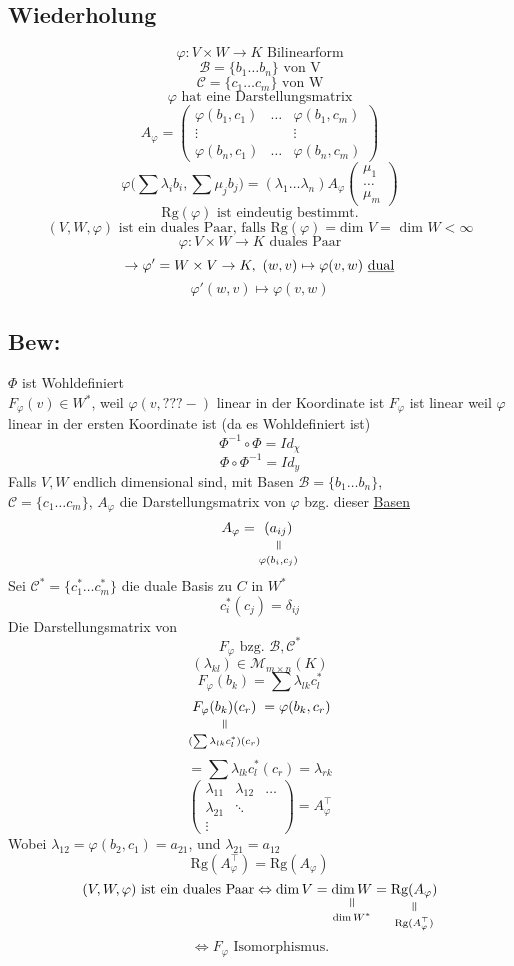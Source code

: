 \documentclass[titlepage,12pt,a4paper,ngerman]{report}
\newcommand{\verteq}{\rotatebox{90}{$\,=$}}
\newcommand{\equalto}[2]{\underset{\scriptstyle\overset{\mkern4mu\verteq}{#2}}{#1}}
\newcommand{\tx}[1]{\textrm{#1}}
\begin{document}
\subsection{Wiederholung}
$$\varphi: V \times W \to K \tx{ Bilinearform}$$
$$\mathcal B = \{b_1 \dots b_n\} \tx{ von V}$$
$$\mathcal C = \{c_1 \dots c_m\} \tx{ von W}$$
$$\varphi \tx{ hat eine Darstellungsmatrix}$$
$$A_\varphi = 
\begin{pmatrix}
\varphi(b_1, c_1) & \dots & \varphi(b_1, c_m) \\
\vdots & & \vdots \\
\varphi(b_n, c_1) & \dots & \varphi(b_n, c_m)	
\end{pmatrix}$$
$$\varphi \bigg( \sum \lambda_i b_i, \sum \mu_j b_j \bigg) = (\lambda_1 \dots \lambda_n) A_\varphi \begin{pmatrix} \mu_1 \\ \dots \\ \mu_m \end{pmatrix}$$
$$\tx{Rg}(\varphi) \tx{ ist eindeutig bestimmt.}$$
$$(V, W, \varphi) \tx{ ist ein duales Paar, falls } \tx{Rg}(\varphi) = \tx{dim } V = \tx{ dim } W < \infty$$
$$ \varphi: V \times W \to K \tx{ duales Paar}$$
$$\rightarrow \varphi' = W \times V \to K,\ (w,v) \mapsto \varphi(v,w) \tx{ \underline{dual}}$$
$$\varphi'(w,v) \mapsto \varphi(v,w)$$
\subsection{Bew:}
$ \Phi $ ist Wohldefiniert\\
$ F_\varphi (v) \in W^* $, weil $ \varphi(v,???-) $ linear in der Koordinate ist $ F_\varphi $ ist linear weil $ \varphi $ linear in der ersten Koordinate ist (da es Wohldefiniert ist)
$$\Phi^{-1} \circ \Phi = Id_\chi$$
$$\Phi \circ \Phi^{-1} = Id_y$$
Falls $V,W$ endlich dimensional sind, mit Basen $\mathcal{B} = \{b_1 \dots b_n\}$,\\ $\mathcal{C} = \{c_1 \dots c_m\}$, $A_\varphi$ die Darstellungsmatrix von $\varphi$ bzg. dieser \underline{\underline{Basen}}
$$A_\varphi = \equalto{(a_{ij})}{\varphi(b_i, c_j)}$$
Sei $\mathcal C^* = \{c_1^* \dots c_m^*\}$ die duale Basis zu $C$ in $W^*$ 
$$c_i^*(c_j) = \delta_{ij}$$
Die Darstellungsmatrix von
$$F_\varphi \tx{ bzg. } \mathcal B, \mathcal C^*$$
$$(\lambda_{kl}) \in \mathcal M_{m \times n}(K)$$
$$F_\varphi (b_k) = \sum \lambda_{lk} c^*_l$$
$$\equalto{F_\varphi (b_k) (c_r)}{(\sum \lambda_{lk}c_l^*)(c_r)} = \varphi (b_k, c_r)$$
$$= \sum \lambda_{lk}c_l^*(c_r) = \lambda_{rk}$$
$$\begin{pmatrix}
\lambda_{11} & \lambda_{12} & \dots \\
\lambda_{21} & \ddots & \\
\vdots & & 
\end{pmatrix} = A_\varphi^\top$$
Wobei $\lambda_{12} = \varphi(b_2, c_1) = a_{21}$, und $\lambda_{21} = a_{12}$
$$\tx{Rg}(A_\varphi^\top) = \tx{Rg}(A_\varphi)$$
$$(V,W,\varphi) \tx{ ist ein duales Paar} \Leftrightarrow \dim V = \equalto{\dim W}{\dim W^*} = \equalto{\tx{Rg}(A_\varphi)}{\tx{Rg}(A_\varphi^\top)}$$ 
$$\Leftrightarrow F_\varphi \tx{ Isomorphismus.}$$
\end{document}
